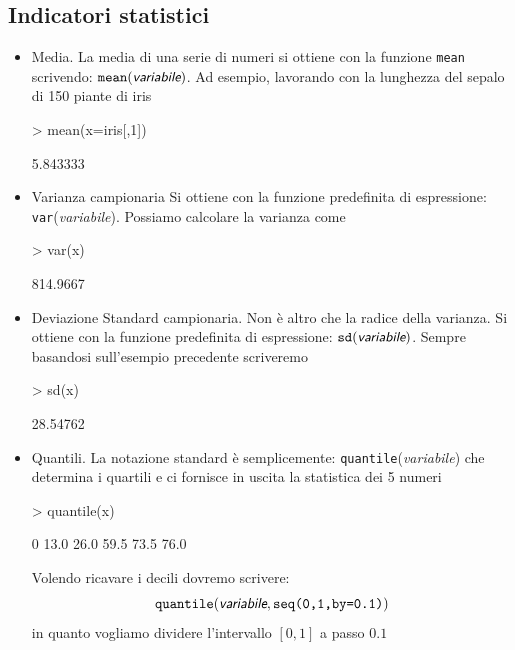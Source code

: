\documentclass[onecolumn,11pt]{book}
\newcommand{\varia}[1]{\textsl{\textsf{#1}}}
\begin{document}
\subsection{Indicatori statistici}
\begin{itemize}
\item{}Media.\vskip0pt
La media di una serie di numeri si ottiene con la funzione \texttt{mean} scrivendo:
$\texttt{mean}(\varia{variabile})$.
Ad esempio, lavorando con la lunghezza del sepalo di 150 piante di iris
\begin{Schunk}
\begin{Sinput}
> mean(x=iris[,1])
\end{Sinput}
\begin{Soutput}
[1] 5.843333
\end{Soutput}
\end{Schunk}
\item{}Varianza campionaria\vskip0pt
Si ottiene con la funzione predefinita di espressione:
\texttt{var}(\varia{variabile}).
Possiamo calcolare la varianza come
\begin{Schunk}
\begin{Sinput}
> var(x)
\end{Sinput}
\begin{Soutput}
[1] 814.9667
\end{Soutput}
\end{Schunk}
\item{}Deviazione Standard campionaria.\vskip0pt
Non \`e altro che la radice della varianza. Si ottiene con la funzione predefinita di espressione:
$\texttt{sd}(\varia{variabile})$.
Sempre basandosi sull'esempio precedente scriveremo
\begin{Schunk}
\begin{Sinput}
> sd(x)
\end{Sinput}
\begin{Soutput}
[1] 28.54762
\end{Soutput}
\end{Schunk}

\item{}Quantili. La notazione standard \`e semplicemente: \texttt{quantile}(\varia{variabile}) che determina i quartili e ci fornisce in uscita la statistica dei 5 numeri
 
\begin{Schunk}
\begin{Sinput}
> quantile(x)
\end{Sinput}
\begin{Soutput}
  0%
13.0 26.0 59.5 73.5 76.0 
\end{Soutput}
\end{Schunk}
 Volendo ricavare i decili dovremo scrivere:
$$\texttt{quantile}(\varia{variabile},\texttt{seq(0,1,by=0.1)})$$
in quanto vogliamo dividere l'intervallo $[0,1]$ a passo $0.1$


\end{itemize}
\end{document}
